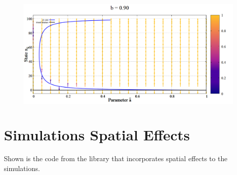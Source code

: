 \begin{figure}[h!]
 \centering
  \includegraphics[width=\linewidth]{images/appendix/vectors/5.png}
\end{figure}

\newpage
\section{Simulations Spatial Effects}
\label{apndx:spacesim}

Shown is the code from the library that incorporates spatial effects to the simulations.

